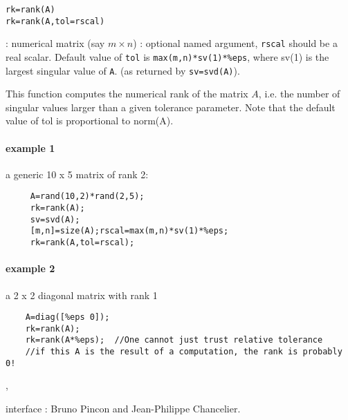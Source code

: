 
\begin{mandesc}
\end{mandesc}

\begin{calling_sequence}
\begin{verbatim}
rk=rank(A)
rk=rank(A,tol=rscal)
\end{verbatim}
\end{calling_sequence}
\begin{parameters}
  \begin{varlist}
    :  numerical matrix (say $m \times n$)
    : optional named argument, \verb+rscal+ should be a real scalar. Default value of \verb+tol+ is \verb+max(m,n)*sv(1)*%eps+, where sv(1) is the largest singular value of \verb+A+. (as returned by \verb+sv=svd(A)+).
  \end{varlist}
\end{parameters}

\begin{mandescription}
This function computes the numerical rank of the matrix $A$, i.e. the number
of singular values larger than a given tolerance parameter. Note that the 
default value of tol is proportional to norm(A).
\end{mandescription}

\begin{examples}
\paragraph{example 1} a generic 10 x 5 matrix of rank 2:
  \begin{Verbatim}
     A=rand(10,2)*rand(2,5);
     rk=rank(A);
     sv=svd(A);
     [m,n]=size(A);rscal=max(m,n)*sv(1)*%eps;
     rk=rank(A,tol=rscal);
  \end{Verbatim}
\paragraph{example 2} a 2 x 2 diagonal matrix with rank 1
  \begin{Verbatim}
    A=diag([%eps 0]);
    rk=rank(A);
    rk=rank(A*%eps);  //One cannot just trust relative tolerance
    //if this A is the result of a computation, the rank is probably 0! 
  \end{Verbatim}

\end{examples}

\begin{manseealso}
  , 
\end{manseealso}

\begin{authors}
   interface : Bruno Pincon and Jean-Philippe Chancelier. 
\end{authors}
